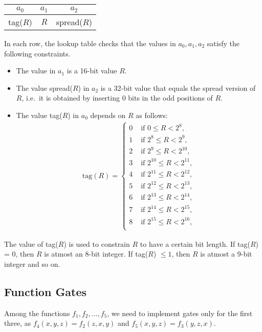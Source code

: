 \documentclass[10pt]{article}
\begin{document}
\begin{center}
  \begin{tabular}{c|c|c}
    $a_0$ & $a_1$ & $a_2$ \\ \hline
    tag($R$) & $R$ & spread($R$)
  \end{tabular}
\end{center}
In each row, the lookup table checks that the values in $a_0, a_1, a_2$ satisfy the following constraints.
\begin{itemize}
  \item The value in $a_1$ is a 16-bit value $R$.
  \item The value spread($R$) in $a_2$ is a 32-bit value that equals the spread version of $R$, i.e.~it is obtained by inserting 0 bits in the odd positions of $R$.
  \item The value tag($R$) in $a_0$ depends on $R$ as follows:
    \begin{align*}
      \text{tag}(R) = \begin{cases}
                  0 & \text{ if } 0 \le R < 2^8,\\
                  1 & \text{ if }  2^8 \le R < 2^9,\\
                  2 & \text{ if }  2^9 \le R < 2^{10},\\
                  3 & \text{ if }  2^{10} \le R < 2^{11},\\
                  4 & \text{ if }  2^{11} \le R < 2^{12},\\
                  5 & \text{ if }  2^{12} \le R < 2^{13},\\
                  6 & \text{ if }  2^{13} \le R < 2^{14},\\
                  7 & \text{ if }  2^{14} \le R < 2^{15},\\
                  8 & \text{ if }  2^{15} \le R < 2^{16},\\
                  \end{cases}
    \end{align*}
\end{itemize}
The value of tag($R$) is used to constrain $R$ to have a certain bit length. If tag($R$) = 0, then $R$ is atmost an 8-bit integer. If tag($R$) $\le  1$, then $R$ is atmost a 9-bit integer and so on.
\subsection{Function Gates}%
\label{sec:function_gates}
Among the functions $f_1, f_2, \ldots,f_5$, we need to implement gates only for the first three, as $f_4(x,y,z) = f_2(z, x, y)$ and $f_5(x,y,z) = f_3(y, z, x)$.
\end{document}
